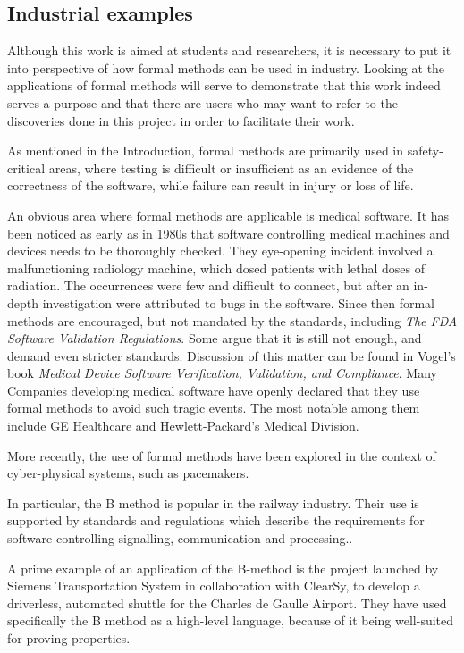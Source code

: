 \documentclass[11pt,journal]{IEEEtran}
\begin{document}
	\subsection{Industrial examples}
	Although this work is aimed at students and researchers, it is necessary to put it into perspective of how formal methods can be used in industry. Looking at the applications of formal methods will serve to demonstrate that this work indeed serves a purpose and that there are users who may want to refer to the discoveries done in this project in order to facilitate their work.
	
	As mentioned in the Introduction, formal methods are primarily used in safety-critical areas, where testing is difficult or insufficient as an evidence of the correctness of the software, while failure can result in injury or loss of life. 
	
	An obvious area where formal methods are applicable is medical software. It has been noticed as early as in 1980s that software controlling medical machines and devices needs to be thoroughly checked. They eye-opening incident involved a malfunctioning radiology machine, which dosed patients with lethal doses of radiation. The occurrences were few and difficult to connect, but after an in-depth investigation were attributed to bugs in the software.\cite{therac} Since then formal methods are encouraged, but not mandated by the standards, including \emph{The FDA Software Validation Regulations}\cite{FDA}. Some argue that it is still not enough, and demand even stricter standards. Discussion of this matter can be found in Vogel's book \emph{Medical Device Software Verification, Validation, and Compliance}\cite{Vogel}. Many Companies developing medical software have openly declared that they use formal methods to avoid such tragic events. The most notable among them include GE Healthcare\cite{ge} and Hewlett-Packard's Medical Division\cite{hp}.
	
	More recently, the use of formal methods have been explored in the context of cyber-physical systems, such as pacemakers. \cite{pacemaker_kwiatkowska1} \cite{pacemaker_kwiatkowska2} \cite{pacemaker_kwiatkowska3}
	
	
	In particular, the B method is popular in the railway industry. Their use is supported by standards and regulations which describe the requirements for software controlling signalling, communication and processing.\cite{railway standard}.
	
	A prime example of an application of the B-method is the project launched by Siemens Transportation System in collaboration with ClearSy, to develop a driverless, automated shuttle for the Charles de Gaulle Airport\cite{airport shuttle}. They have used specifically the B method as a high-level language, because of it being well-suited for proving properties.
	
\end{document}
